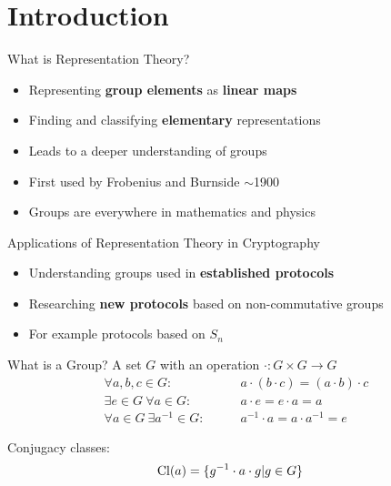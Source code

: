 
\section{Introduction}

\begin{frame}{What is Representation Theory?}
    \large
    \begin{itemize}
        \item Representing \textbf{group elements} as \textbf{linear maps} \pause
        \item Finding and classifying \textbf{elementary} representations \pause
        \item Leads to a deeper understanding of groups \pause
        \item First used by Frobenius and Burnside $\sim$1900 \pause
        \item Groups are everywhere in mathematics and physics
    \end{itemize}
\end{frame}

\begin{frame}{Applications of Representation Theory in Cryptography}
    \large
    \begin{itemize}
        \item Understanding groups used in \textbf{established protocols} \pause
        \item Researching \textbf{new protocols} based on non-commutative groups \pause
        \item For example protocols based on $S_n$
    \end{itemize}
    
    \normalsize
    \hspace*{\fill} \cite{khovanov2022monoidal,doliskani2008cryptosystem}
\end{frame}

\begin{frame}{What is a Group?}
    \Large
    A set $G$ with an operation $\cdot: G \times G \to G$ \pause
    \large
    \begin{align*}
        \forall a, b, c \in G: \qquad & a \cdot (b \cdot c) = (a \cdot b) \cdot c \\
        \exists e \in G\ \forall a \in G: \qquad & a \cdot e = e \cdot a = a \\
        \forall a \in G\ \exists a^{-1} \in G: \qquad & a^{-1} \cdot a = a \cdot a^{-1} = e
    \end{align*}

    \pause
    \vspace{1em}
    Conjugacy classes:
    \begin{align*}
        \operatorname{Cl}(a) & = \{g^{-1} \cdot a \cdot g | g \in G \}
    \end{align*}
    
\end{frame}

